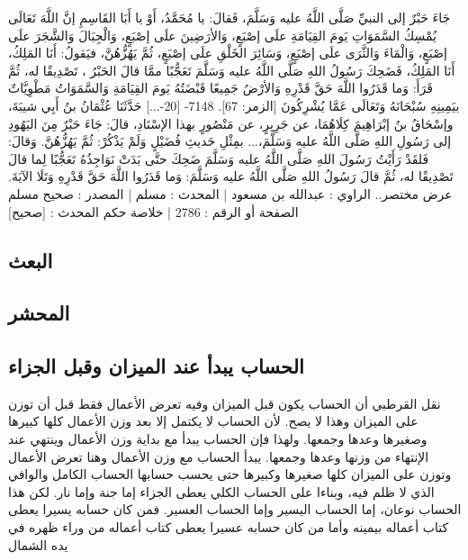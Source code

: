 جَاءَ حَبْرٌ إلى النبيِّ صَلَّى اللَّهُ عليه وَسَلَّمَ، فَقالَ: يا مُحَمَّدُ، أَوْ يا أَبَا القَاسِمِ إنَّ اللَّهَ تَعَالَى يُمْسِكُ السَّمَوَاتِ يَومَ القِيَامَةِ علَى إصْبَعٍ، وَالأرَضِينَ علَى إصْبَعٍ، وَالْجِبَالَ وَالشَّجَرَ علَى إصْبَعٍ، وَالْمَاءَ وَالثَّرَى علَى إصْبَعٍ، وَسَائِرَ الخَلْقِ علَى إصْبَعٍ، ثُمَّ يَهُزُّهُنَّ، فيَقولُ: أَنَا المَلِكُ، أَنَا المَلِكُ، فَضَحِكَ رَسُولُ اللهِ صَلَّى اللَّهُ عليه وَسَلَّمَ تَعَجُّبًا ممَّا قالَ الحَبْرُ ، تَصْدِيقًا له، ثُمَّ قَرَأَ: {وَما قَدَرُوا اللَّهَ حَقَّ قَدْرِهِ وَالأرْضُ جَمِيعًا قَبْضَتُهُ يَومَ القِيَامَةِ وَالسَّمَوَاتُ مَطْوِيَّاتٌ بيَمِينِهِ سُبْحَانَهُ وَتَعَالَى عَمَّا يُشْرِكُونَ} [الزمر: 67]. 7148- [20-...] حَدَّثَنَا عُثْمَانُ بنُ أَبِي شيبَةَ، وإسْحَاقُ بنُ إبْرَاهِيمَ كِلَاهُمَا، عن جَرِيرٍ، عن مَنْصُورٍ بهذا الإسْنَادِ، قالَ: جَاءَ حَبْرٌ مِنَ اليَهُودِ إلى رَسُولِ اللهِ صَلَّى اللَّهُ عليه وَسَلَّمَ،... بمِثْلِ حَديثِ فُضَيْلٍ وَلَمْ يَذْكُرْ: ثُمَّ يَهُزُّهُنَّ. وَقالَ: فَلقَدْ رَأَيْتُ رَسُولَ اللهِ صَلَّى اللَّهُ عليه وَسَلَّمَ ضَحِكَ حتَّى بَدَتْ نَوَاجِذُهُ تَعَجُّبًا لِما قالَ تَصْدِيقًا له، ثُمَّ قالَ رَسُولُ اللهِ صَلَّى اللَّهُ عليه وَسَلَّمَ: {وَما قَدَرُوا اللَّهَ حَقَّ قَدْرِهِ} وَتَلَا الآيَةَ.
عرض مختصر..
الراوي : عبدالله بن مسعود | المحدث : مسلم | المصدر : صحيح مسلم
الصفحة أو الرقم : 2786 | خلاصة حكم المحدث : [صحيح]

\subsection{البعث}

\subsection{المحشر}





\subsection{الحساب يبدأ عند الميزان وقبل الجزاء}


نقل القرطبي أن الحساب يكون قبل الميزان وفيه تعرض الأعمال فقط قبل أن توزن على الميزان وهذا لا يصح. لأن الحساب لا يكتمل إلا بعد وزن الأعمال كلها كبيرها وصغيرها وعدها وجمعها. ولهذا فإن الحساب يبدأ مع بداية وزن الأعمال وينتهي عند الإنتهاء من وزنها وعدها وجمعها. يبدأ الحساب مع وزن الأعمال وهنا تعرض الأعمال وتوزن على الميزان كلها صغيرها وكبيرها حتى يحسب حسابها الحساب الكامل والوافي الذي لا ظلم فيه، وبناءا على الحساب الكلي يعطى الجزاء إما جنة وإما نار. لكن هذا الحساب نوعان، إما الحساب اليسير وإما الحساب العسير. فمن كان حسابه يسيرا يعطى كتاب أعماله بيمينه وأما من كان حسابه عسيرا يعطى كتاب أعماله من وراء ظهره في يده الشمال 

